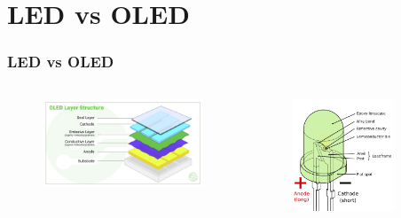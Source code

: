 \documentclass[aspectratio=169,11pt, allowframebreak=0.9]{beamer}
\begin{document}
    \section{LED vs OLED}
    \begin{frame}
    \frametitle{LED vs OLED}
    \begin{columns}
    \begin{figure}
        \centering
        \includegraphics[width=1\textwidth]{oled2_.jpg}
       
    \end{figure}
    \begin{figure}
        \centering
        \includegraphics[width=0.8\textwidth]{led}
    
    \end{figure}
    \end{columns}
    \end{frame}
\end{document}
